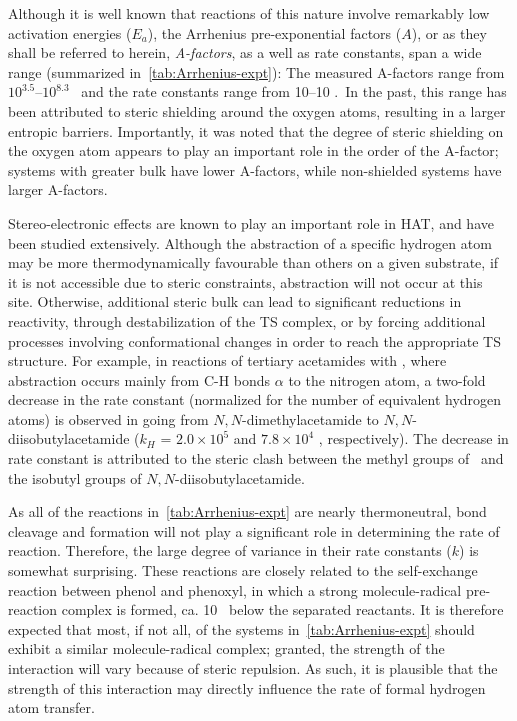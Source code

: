 Although it is well known that reactions of this nature involve remarkably low activation energies ($E_a$),\cite{Lucarini1996, Mahoney1970a, Mahoney1975, Korcek1972} the Arrhenius pre-exponential factors ($A$), or as they shall be referred to herein, \emph{A-factors}, as a well as rate constants, span a wide range (summarized in~\ref{tab:Arrhenius-expt}): The measured A-factors range from $10^{3.5}$--$10^{8.3}$ \Ms\ and the rate constants range from 10--10 \Ms.\ In the past, this range has been attributed to steric shielding around the oxygen atoms, resulting in a larger entropic barriers.\cite{DiLabio2005} Importantly, it was noted that the degree of steric shielding on the oxygen atom appears to play an important role in the order of the A-factor; systems with greater bulk have lower A-factors, while non-shielded systems have larger A-factors.

Stereo-electronic effects are known to play an important role in HAT, and have been studied extensively.\cite{Finn2004, Salamone2011, Pischel2001, Griller1981, Bietti2011, Salamone2012, Malatesta1982, Salamone2014} Although the abstraction of a specific hydrogen atom may be more thermodynamically favourable than others on a given substrate, if it is not accessible due to steric constraints, abstraction will not occur at this site. Otherwise, additional steric bulk can lead to significant reductions in reactivity, through destabilization of the TS complex, or by forcing additional processes involving conformational changes in order to reach the appropriate TS structure. For example, in reactions of tertiary acetamides with \cumo,\cite{Salamone2014} where abstraction occurs mainly from C-H bonds $\alpha$ to the nitrogen atom, a two-fold decrease in the rate constant (normalized for the number of equivalent hydrogen atoms) is observed in going from $N,N$-dimethylacetamide to $N,N$-diisobutylacetamide ($k_H$ = $2.0 \times 10^5$ and $7.8 \times 10^4$ \Ms, respectively). The decrease in rate constant is attributed to the steric clash between the methyl groups of \cumo\ and the isobutyl groups of $N,N$-diisobutylacetamide.

As all of the reactions in~\ref{tab:Arrhenius-expt} are nearly thermoneutral,
bond cleavage and formation will not play a significant role in determining the rate of reaction. Therefore, the large degree of variance in their rate constants ($k$) is somewhat surprising. These reactions are closely related to the self-exchange reaction between phenol and phenoxyl,\cite{Mayer2002} in which a strong molecule-radical pre-reaction complex is formed, ca. 10 \kcalmol\ below the separated reactants. It is therefore expected that most, if not all, of the systems in~\ref{tab:Arrhenius-expt} should exhibit a similar molecule-radical complex; granted, the strength of the interaction will vary because of steric repulsion. As such, it is plausible that the strength of this interaction may directly influence the rate of formal hydrogen atom transfer.

